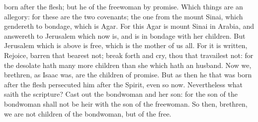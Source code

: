 {born
after the
flesh;
but
he
of the
freewoman
{}
by
promise.
Which
things
are an
allegory:
for
these
are
the
two
covenants; the
one
from the
mount
Sinai, which
gendereth
to
bondage,
which
is
Agar.
For
this
Agar
is
mount
Sinai
in
Arabia,
and answereth
to
Jerusalem
which
now
is,
and is in
bondage
with
her
children.
But
Jerusalem which
is
above
is
free,
which
is the
mother of
us
all.
For it is
written,
Rejoice,
{}
barren
that
bearest
not; break
forth
and
cry, thou
that
travailest
not:
for the desolate
hath
many
more
children
than she
which
hath an
husband.
Now
we,
brethren,
as Isaac
was,
are the
children of
promise.
But
as
then he
that was
born
after the
flesh
persecuted
him
{}
after the
Spirit,
even
so
{}
now.
Nevertheless
what
saith the
scripture? Cast
out the
bondwoman
and
her
son:
for the
son of the
bondwoman
shall
not be
heir
with the
son of the
freewoman.
So
then,
brethren, we
are
not
children of the
bondwoman,
but of the
free.

}

